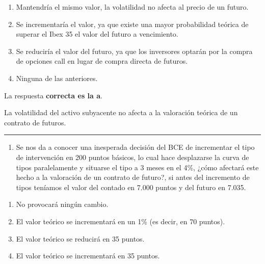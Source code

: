 \documentclass[
  letterpaper,
  DIV=11,
  numbers=noendperiod]{scrreprt}
\providecommand{\tightlist}{%
  \setlength{\itemsep}{0pt}\setlength{\parskip}{0pt}}\usepackage{longtable,booktabs,array}
\begin{document}
\begin{enumerate}
\def\labelenumi{\alph{enumi})}
\item
  Mantendría el mismo valor, la volatilidad no afecta al precio de un
  futuro.
\item
  Se incrementaría el valor, ya que existe una mayor probabilidad
  teórica de superar el Ibex 35 el valor del futuro a vencimiento.
\item
  Se reduciría el valor del futuro, ya que los inversores optarán por la
  compra de opciones call en lugar de compra directa de futuros.
\item
  Ninguna de las anteriores.
\end{enumerate}

\begin{tcolorbox}[enhanced jigsaw, left=2mm, opacityback=0, colback=white, breakable, arc=.35mm, bottomrule=.15mm, rightrule=.15mm, toprule=.15mm, leftrule=.75mm, colframe=quarto-callout-tip-color-frame]
\begin{minipage}[t]{5.5mm}
\textcolor{quarto-callout-tip-color}{\faLightbulb}
\end{minipage}%
\begin{minipage}[t]{\textwidth - 5.5mm}

La respuesta \textbf{correcta es la a}.

La volatilidad del activo subyacente no afecta a la valoración teórica
de un contrato de futuros.

\end{minipage}%
\end{tcolorbox}

\begin{center}\rule{0.5\linewidth}{0.5pt}\end{center}

\begin{enumerate}
\def\labelenumi{\arabic{enumi}.}
\setcounter{enumi}{17}
\tightlist
\item
  Se nos da a conocer una inesperada decisión del BCE de incrementar el
  tipo de intervención en 200 puntos básicos, lo cual hace desplazarse
  la curva de tipos paralelamente y situarse el tipo a 3 meses en el
  4\%, ¿cómo afectará este hecho a la valoración de un contrato de
  futuro?, si antes del incremento de tipos teníamos el valor del
  contado en 7.000 puntos y del futuro en 7.035.
\end{enumerate}

\begin{enumerate}
\def\labelenumi{\alph{enumi})}
\item
  No provocará ningún cambio.
\item
  El valor teórico se incrementará en un 1\% (es decir, en 70 puntos).
\item
  El valor teórico se reducirá en 35 puntos.
\item
  El valor teórico se incrementará en 35 puntos.
\end{enumerate}
\end{document}
